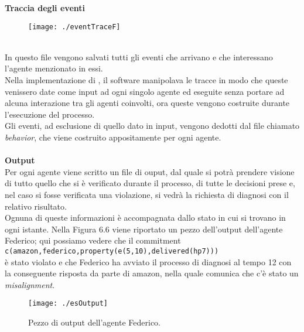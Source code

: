 \documentclass[a4paper,12pt]{report}
\begin{document}
\newpage
\textbf{Traccia degli eventi}
\begin{figure}[h]
    \texttt{[image: ./eventTraceF]}
    \label{trace}
\end{figure}
\\In questo file vengono salvati tutti gli eventi che arrivano e che interessano l'agente menzionato in essi.\\
Nella implementazione di \cite{rif5}, il software manipolava le tracce in modo che queste venissero
date come input ad ogni singolo agente ed eseguite senza portare ad alcuna
interazione tra gli agenti coinvolti, ora queste vengono costruite durante l'esecuzione del processo.\\
Gli eventi, ad esclusione di quello dato in input, vengono dedotti dal file chiamato \textit{behavior}, che viene costruito appositamente per ogni agente.\\
\\\textbf{Output}\\
Per ogni agente viene scritto un file di ouput, dal quale si potrà prendere visione di tutto quello che si è verificato durante il processo,  di tutte le decisioni prese e, nel caso si fosse verificata una violazione,
si vedrà la richiesta di diagnosi con il relativo risultato.\\
Ognuna di queste informazioni è accompagnata dallo stato in cui si trovano in ogni istante.
\newpage
Nella Figura 6.6 viene riportato un pezzo dell'output dell'agente Federico; qui possiamo vedere che il commitment\\\texttt{c(amazon,federico,property(e(5,10),delivered(hp7)))}\\è stato violato e che Federico ha avviato il processo di diagnosi al tempo 12 con la conseguente risposta da parte di amazon, nella quale comunica che c'è stato un \textit{misalignment}.
\begin{figure}[h]
    \texttt{[image: ./esOutput]}
    \caption{Pezzo di output dell'agente Federico.}
    \label{output}
\end{figure}
\newpage
\end{document}
